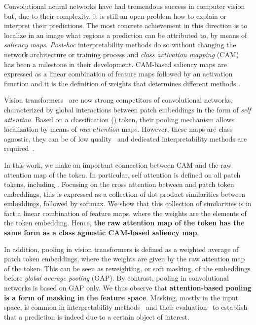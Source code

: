 Convolutional neural networks have had tremendous success in computer vision ~\cite{he2016deep,liu2022convnet} but, due
to their complexity, it is still an open problem how to explain or interpret their predictions. The most concrete
achievement in this direction is to localize in an image what regions a prediction can be attributed to, by means of
\emph{saliency maps}. \emph{Post-hoc} interpretability methods do so without changing the network architecture or
training process and \emph{class activation mapping} (CAM)~\cite{zhou2016learning} has been a milestone in their
development. CAM-based saliency maps are expressed as a linear combination of feature maps followed by an activation
function and it is the definition of weights that determines different methods
\cite{DBLP:journals/corr/SelvarajuDVCPB16,DBLP:journals/corr/abs-1710-11063,DBLP:journals/corr/abs-1910-01279}.


Vision transformers~\cite{dosovitskiy2020image} are now strong competitors of convolutional networks, characterized by
global interactions between patch embeddings in the form of \emph{self attention}.
Based on a classification (\cls) token, their pooling mechanism allows localization by means of \emph{raw attention}
maps. However, these maps are class agnostic, they can be of low quality~\cite{dino} and dedicated interpretability
methods are required~\cite{chefer2021transformer}.

In this work, we make an important connection between CAM and the raw attention map of the \cls token.
In particular, self attention is defined on all patch tokens, including \cls. Focusing on the cross attention between
\cls and patch token embeddings, this is expressed as a collection of dot product similarities between embeddings,
followed by softmax.
We show that this collection of similarities is in fact a linear combination of feature maps, where the weights are the
elements of the \cls token embedding. Hence, \textbf{the raw attention map of the \cls token has the same form as a
class agnostic CAM-based saliency map}.

In addition, pooling in vision transformers is defined as a weighted average of patch token embeddings, where the
weights are given by the raw attention map of the \cls token. This can be seen as reweighting, or soft masking, of the
embeddings before \emph{global average pooling} (GAP). By contrast, pooling in convolutional networks is based on GAP
only. We thus observe that \textbf{attention-based pooling is a form of masking in the feature space}. Masking, mostly
in the input space, is common in interpretability methods~\cite{DBLP:journals/corr/abs-1910-01279} and their
evaluation~\cite{DBLP:journals/corr/abs-1710-11063, petsiuk2018rise} to establish that a prediction is indeed due to a
certain object of interest.

